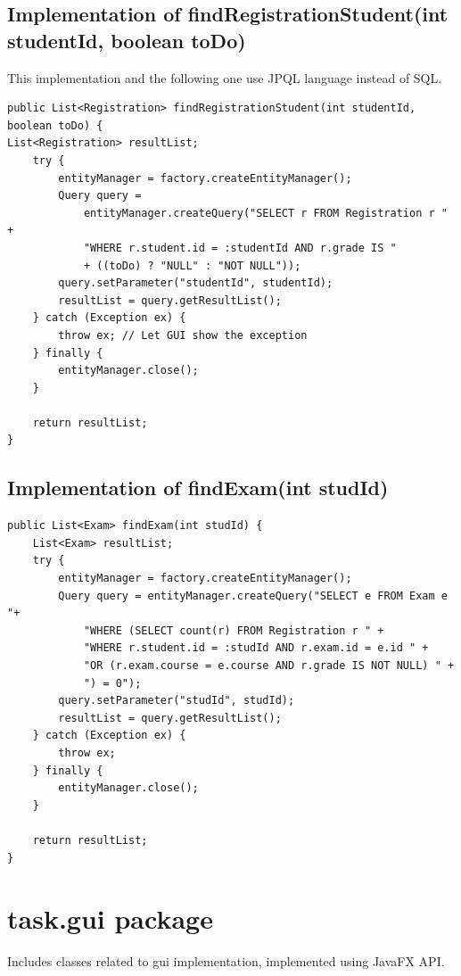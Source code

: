 \documentclass{report}
\begin{document}
\subsection*{Implementation of findRegistrationStudent(int studentId, boolean toDo)}
This implementation and the following one use JPQL language instead of SQL.
\begin{lstlisting}
public List<Registration> findRegistrationStudent(int studentId, boolean toDo) {
List<Registration> resultList;
	try {
		entityManager = factory.createEntityManager();
		Query query =
			entityManager.createQuery("SELECT r FROM Registration r " +
			"WHERE r.student.id = :studentId AND r.grade IS "
			+ ((toDo) ? "NULL" : "NOT NULL"));
		query.setParameter("studentId", studentId);
		resultList = query.getResultList();
	} catch (Exception ex) {
		throw ex; // Let GUI show the exception
	} finally {
		entityManager.close();
	}

	return resultList;
}
\end{lstlisting}

\subsection*{Implementation of findExam(int studId)}
\begin{lstlisting}
public List<Exam> findExam(int studId) {
	List<Exam> resultList;
	try {
		entityManager = factory.createEntityManager();
		Query query = entityManager.createQuery("SELECT e FROM Exam e "+
			"WHERE (SELECT count(r) FROM Registration r " +
			"WHERE r.student.id = :studId AND r.exam.id = e.id " +
			"OR (r.exam.course = e.course AND r.grade IS NOT NULL) " +
			") = 0");
		query.setParameter("studId", studId);
		resultList = query.getResultList();
	} catch (Exception ex) {
		throw ex;
	} finally {
		entityManager.close();
	}

	return resultList;
}
\end{lstlisting}

\section*{task.gui package}
Includes classes related to gui implementation, implemented using JavaFX API.

\end{document}
